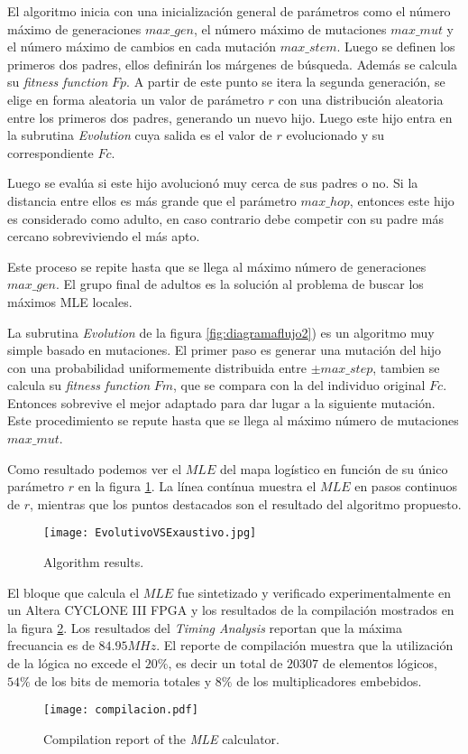 El algoritmo inicia con una inicialización general de parámetros como el número máximo de generaciones $max\_gen$, el número máximo de mutaciones $max\_mut$ y el número máximo de cambios en cada mutación $max\_stem$.
Luego se definen los primeros dos padres, ellos definirán los márgenes de búsqueda.
Además se calcula su \textit{fitness function} $Fp$.
A partir de este punto se itera la segunda generación, se elige en forma aleatoria un valor de parámetro $r$ con una distribución aleatoria entre los primeros dos padres, generando un nuevo hijo.
Luego este hijo entra en la subrutina \textit{Evolution} cuya salida es el valor de $r$ evolucionado y su correspondiente $Fc$.

Luego se evalúa si este hijo avolucionó muy cerca de sus padres o no.
Si la distancia entre ellos es más grande que el parámetro $max\_hop$, entonces este hijo es considerado como adulto, en caso contrario debe competir con su padre más cercano sobreviviendo el más apto.

Este proceso se repite hasta que se llega al máximo número de  generaciones $max\_gen$.
El grupo final de adultos es la solución al problema de buscar los máximos MLE locales.

La subrutina \textit{Evolution} de la figura \ref{fig:diagramaflujo2}) es un algoritmo muy simple basado en mutaciones.
El primer paso es generar una mutación del hijo con una probabilidad uniformemente distribuida entre $\pm max\_step$, tambien se calcula su \textit{fitness function} $Fm$, que se compara con la del individuo original $Fc$.
Entonces sobrevive el mejor adaptado para dar lugar a la siguiente mutación.
Este procedimiento se repute hasta que se llega al máximo número de mutaciones $max\_mut$.

Como resultado podemos ver el $MLE$ del mapa logístico en función de su único parámetro $r$ en la figura \ref{fig:resultadoAlgorithm}.
La línea contínua muestra el $MLE$ en pasos continuos de $r$, mientras que los puntos destacados son el resultado del algoritmo propuesto.
%
\begin{figure}
	\centering
	\texttt{[image: EvolutivoVSExaustivo.jpg]}\\
	\caption{Algorithm results.}\label{fig:resultadoAlgorithm}
\end{figure}

El bloque que calcula el $MLE$ fue sintetizado y verificado experimentalmente en un Altera CYCLONE III FPGA y los resultados de la compilación mostrados en la figura \ref{fig:compilacion}.
Los resultados del \textit{Timing Analysis} reportan que la máxima frecuancia es de $84.95MHz$.
El reporte de compilación muestra que la utilización de la lógica no excede el $20\%$, es decir un total de $20307$ de elementos lógicos, $54\%$ de los bits de memoria totales y $8\%$ de los multiplicadores embebidos.
%
\begin{figure}
	\centering
	\texttt{[image: compilacion.pdf]}\\
	\caption{Compilation report of the \textit{MLE} calculator.}\label{fig:compilacion}
\end{figure}

